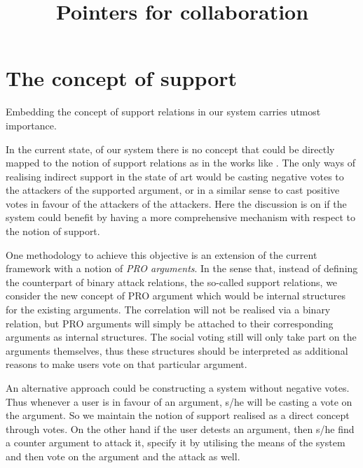 \documentclass{article}
\begin{document}
\title{Pointers for collaboration}

\maketitle


\section{The concept of support} %

Embedding the concept of support relations in our system carries utmost importance.

In the current state, of our system there is no concept that could be directly mapped to the notion of support relations as in the works like \cite{DBLP:journals/ijis/AmgoudCLL08}. The only ways of realising indirect support in the state of art would be casting negative votes to the attackers of the supported argument, or in a similar sense to cast positive votes in favour of the attackers of the attackers. Here the discussion is on if the system could benefit by having a more comprehensive mechanism with respect to the notion of support. 

One methodology to achieve this objective is an extension of the current framework with a notion of \emph{PRO arguments}. In the sense that, instead of defining the counterpart of binary attack relations, the so-called support relations, we consider the new concept of PRO argument which would be internal structures for the existing arguments. The correlation will not be realised via a binary relation, but PRO arguments will simply be attached to their corresponding arguments as internal structures. The social voting still will only take part on the arguments themselves, thus these structures should be interpreted as additional reasons to make users vote on that particular argument.

An alternative approach could be constructing a system without negative votes. Thus whenever a user is in favour of an argument, s/he will be casting a vote on the argument. So we maintain the notion of support realised as  a direct concept through votes. On the other hand if the user detests an argument, then s/he find a counter argument to attack it, specify it by utilising the means of the system and then vote on the argument and the attack as well.
\end{document}
